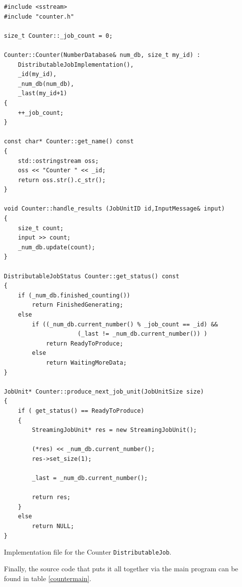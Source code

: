 \documentclass[a4paper,12pt,english]{report}
\renewcommand{\DJ}{\texttt{DistributableJob}}
\begin{document}
\begin{table}[!htb]
\lstset{language=C++}
\begin{lstlisting}[frame=single]
#include <sstream>
#include "counter.h"

size_t Counter::_job_count = 0;

Counter::Counter(NumberDatabase& num_db, size_t my_id) :
    DistributableJobImplementation(),
    _id(my_id),
    _num_db(num_db),
    _last(my_id+1)
{
    ++_job_count;
}

const char* Counter::get_name() const
{
    std::ostringstream oss;
    oss << "Counter " << _id;
    return oss.str().c_str();
}

void Counter::handle_results (JobUnitID id,InputMessage& input)
{
    size_t count;
    input >> count;
    _num_db.update(count);
}

DistributableJobStatus Counter::get_status() const
{
    if (_num_db.finished_counting())
        return FinishedGenerating;
    else
        if ((_num_db.current_number() % _job_count == _id) &&
                     (_last != _num_db.current_number()) )
            return ReadyToProduce;
        else
            return WaitingMoreData;
}

JobUnit* Counter::produce_next_job_unit(JobUnitSize size)
{
    if ( get_status() == ReadyToProduce)
    {
        StreamingJobUnit* res = new StreamingJobUnit();

        (*res) << _num_db.current_number();
        res->set_size(1);

        _last = _num_db.current_number();

        return res;
    }
    else
        return NULL;
}
\end{lstlisting}
\centering \caption{Implementation file for the Counter \DJ.} \label{countersrc}
\end{table}

Finally, the source code that puts it all together via the main program can be found in table \ref{countermain}.
\end{document}
